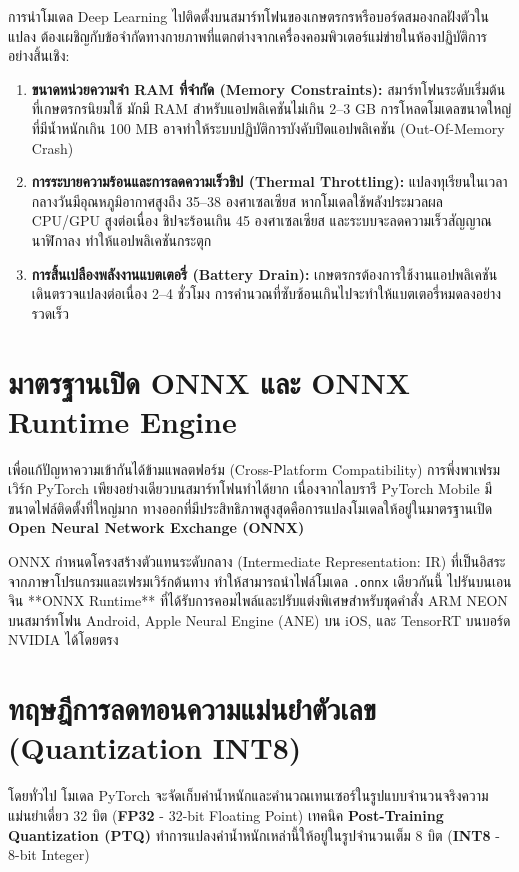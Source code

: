 การนำโมเดล Deep Learning ไปติดตั้งบนสมาร์ทโฟนของเกษตรกรหรือบอร์ดสมองกลฝังตัวในแปลง ต้องเผชิญกับข้อจำกัดทางกายภาพที่แตกต่างจากเครื่องคอมพิวเตอร์แม่ข่ายในห้องปฏิบัติการอย่างสิ้นเชิง:

\begin{enumerate}[leftmargin=1.5em, itemsep=3pt]
    \item \textbf{ขนาดหน่วยความจำ RAM ที่จำกัด (Memory Constraints):} สมาร์ทโฟนระดับเริ่มต้นที่เกษตรกรนิยมใช้ มักมี RAM สำหรับแอปพลิเคชันไม่เกิน 2--3 GB การโหลดโมเดลขนาดใหญ่ที่มีน้ำหนักเกิน 100 MB อาจทำให้ระบบปฏิบัติการบังคับปิดแอปพลิเคชัน (Out-Of-Memory Crash)
    \item \textbf{การระบายความร้อนและการลดความเร็วชิป (Thermal Throttling):} แปลงทุเรียนในเวลากลางวันมีอุณหภูมิอากาศสูงถึง 35--38 องศาเซลเซียส หากโมเดลใช้พลังประมวลผล CPU/GPU สูงต่อเนื่อง ชิปจะร้อนเกิน 45 องศาเซลเซียส และระบบจะลดความเร็วสัญญาณนาฬิกาลง ทำให้แอปพลิเคชันกระตุก
    \item \textbf{การสิ้นเปลืองพลังงานแบตเตอรี่ (Battery Drain):} เกษตรกรต้องการใช้งานแอปพลิเคชันเดินตรวจแปลงต่อเนื่อง 2--4 ชั่วโมง การคำนวณที่ซับซ้อนเกินไปจะทำให้แบตเตอรี่หมดลงอย่างรวดเร็ว
\end{enumerate}

\section{มาตรฐานเปิด ONNX และ ONNX Runtime Engine}

เพื่อแก้ปัญหาความเข้ากันได้ข้ามแพลตฟอร์ม (Cross-Platform Compatibility) การพึ่งพาเฟรมเวิร์ก PyTorch เพียงอย่างเดียวบนสมาร์ทโฟนทำได้ยาก เนื่องจากไลบรารี PyTorch Mobile มีขนาดไฟล์ติดตั้งที่ใหญ่มาก ทางออกที่มีประสิทธิภาพสูงสุดคือการแปลงโมเดลให้อยู่ในมาตรฐานเปิด \textbf{Open Neural Network Exchange (ONNX)}

ONNX กำหนดโครงสร้างตัวแทนระดับกลาง (Intermediate Representation: IR) ที่เป็นอิสระจากภาษาโปรแกรมและเฟรมเวิร์กต้นทาง ทำให้สามารถนำไฟล์โมเดล \texttt{.onnx} เดียวกันนี้ ไปรันบนเอนจิน **ONNX Runtime** ที่ได้รับการคอมไพล์และปรับแต่งพิเศษสำหรับชุดคำสั่ง ARM NEON บนสมาร์ทโฟน Android, Apple Neural Engine (ANE) บน iOS, และ TensorRT บนบอร์ด NVIDIA ได้โดยตรง

\section{ทฤษฎีการลดทอนความแม่นยำตัวเลข (Quantization INT8)}

โดยทั่วไป โมเดล PyTorch จะจัดเก็บค่าน้ำหนักและคำนวณเทนเซอร์ในรูปแบบจำนวนจริงความแม่นยำเดี่ยว 32 บิต (\textbf{FP32} - 32-bit Floating Point) เทคนิค \textbf{Post-Training Quantization (PTQ)} ทำการแปลงค่าน้ำหนักเหล่านี้ให้อยู่ในรูปจำนวนเต็ม 8 บิต (\textbf{INT8} - 8-bit Integer)

